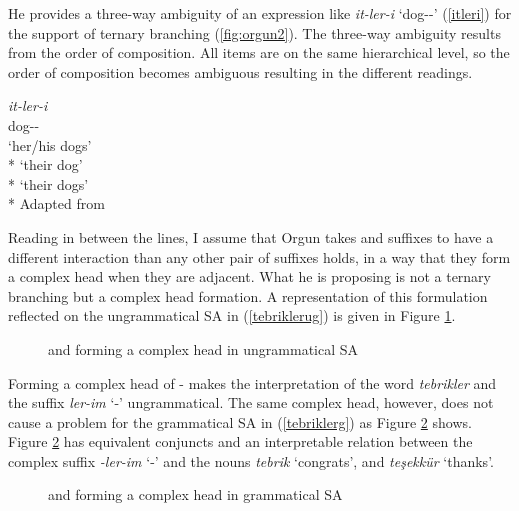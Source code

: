 He provides a three-way ambiguity of an expression like \textit{it-ler-i} `dog-{\Pl}-{\Poss}' (\ref{itleri}) for the support of ternary branching (\ref{fig:orgun2}). The three-way ambiguity results from the order of composition. All items are on the same hierarchical level, so the order of composition becomes ambiguous resulting in the different readings.
\begin{exe}
    \ex \label{itleri}
    \gll \textit{it-ler-i} \\ dog-{\Pl}-{\Poss} \\
    \glt `her/his dogs' \\* `their dog' \\* `their dogs' \\*
    \hfill Adapted from \citet{orgun1995flat}
\end{exe}

Reading in between the lines, I assume that Orgun takes {\Pl} and {\Poss} suffixes to have a different interaction than any other pair of suffixes holds, in a way that they form a complex head when they are adjacent. What he is proposing is not a ternary branching but a complex head formation. A representation of this formulation reflected on the ungrammatical SA in (\ref{tebriklerug}) is given in Figure \ref{fig:furkan1}.

\begin{figure}[hbt!]
    \centering
    \caption{{\Pl} and {\Poss} forming a complex head in ungrammatical SA}
    \label{fig:furkan1}
\end{figure}


Forming a complex head of {\Pl-\Poss} makes the interpretation of the word \textit{tebrikler} and the suffix \textit{ler-im} `{\Pl-\Poss}' ungrammatical. The same complex head, however, does not cause a problem for the grammatical SA in (\ref{tebriklerg}) as Figure \ref{fig:furkan2} shows. Figure \ref{fig:furkan2} has equivalent conjuncts and an interpretable relation between the complex suffix \textit{-ler-im} `{\Pl-\Poss}' and the nouns \textit{tebrik} `congrats', and \textit{teşekkür} `thanks'. 

\begin{figure}[hbt!]
    \centering
    \caption{{\Pl} and {\Poss} forming a complex head in grammatical SA}
    \label{fig:furkan2}
\end{figure}

